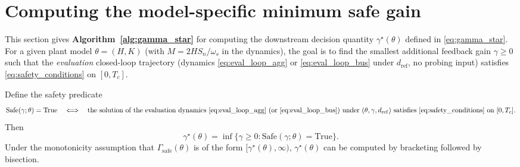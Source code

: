 \documentclass[10pt]{article}
\newcommand{\Safe}{\mathrm{Safe}}
\newcommand{\Gammasafe}{\Gamma_{\mathrm{safe}}}
\begin{document}
\section{Computing the model-specific minimum safe gain}
\label{sec:gamma_star}

This section gives \textbf{Algorithm~\ref{alg:gamma_star}} for
computing the downstream decision quantity
\(\gamma^\star(\theta)\) defined in \eqref{eq:gamma_star}. For a given
plant model \(\theta=(H,K)\) (with \(M=2HS_n/\omega_s\) in the dynamics), the goal is to find the smallest
additional feedback gain \(\gamma\ge 0\) such that the \emph{evaluation} closed-loop
trajectory (dynamics \eqref{eq:eval_loop_agg} or \eqref{eq:eval_loop_bus} under \(d_{\mathrm{ref}}\), no probing input) satisfies \eqref{eq:safety_conditions} on \([0,T_c]\).

Define the safety predicate
\[
\Safe(\gamma;\theta)=\text{True}
\quad\Longleftrightarrow\quad
\text{the solution of the evaluation dynamics \eqref{eq:eval_loop_agg} (or \eqref{eq:eval_loop_bus}) under }(\theta,\gamma,d_{\mathrm{ref}})
\text{ satisfies \eqref{eq:safety_conditions} on }[0,T_c].
\]
Then
\[
\gamma^\star(\theta)
=
\inf\{\gamma\ge 0:\Safe(\gamma;\theta)=\text{True}\}.
\]
Under the monotonicity assumption that \(\Gammasafe(\theta)\) is of the form
\([\gamma^\star(\theta),\infty)\), \(\gamma^\star(\theta)\) can be
computed by bracketing followed by bisection.
\end{document}
